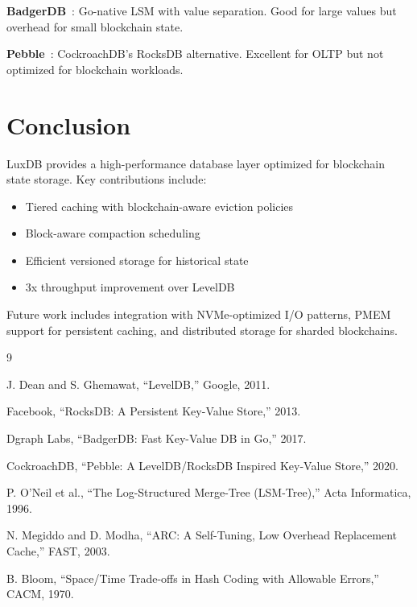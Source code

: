 \documentclass[11pt,a4paper]{article}
\begin{document}
\textbf{BadgerDB}~\cite{badger}: Go-native LSM with value separation. Good for large values but overhead for small blockchain state.

\textbf{Pebble}~\cite{pebble}: CockroachDB's RocksDB alternative. Excellent for OLTP but not optimized for blockchain workloads.

\section{Conclusion}

LuxDB provides a high-performance database layer optimized for blockchain state storage. Key contributions include:

\begin{itemize}
    \item Tiered caching with blockchain-aware eviction policies
    \item Block-aware compaction scheduling
    \item Efficient versioned storage for historical state
    \item 3x throughput improvement over LevelDB
\end{itemize}

Future work includes integration with NVMe-optimized I/O patterns, PMEM support for persistent caching, and distributed storage for sharded blockchains.

\begin{thebibliography}{9}

J. Dean and S. Ghemawat, ``LevelDB,'' Google, 2011.

Facebook, ``RocksDB: A Persistent Key-Value Store,'' 2013.

Dgraph Labs, ``BadgerDB: Fast Key-Value DB in Go,'' 2017.

CockroachDB, ``Pebble: A LevelDB/RocksDB Inspired Key-Value Store,'' 2020.

P. O'Neil et al., ``The Log-Structured Merge-Tree (LSM-Tree),'' Acta Informatica, 1996.

N. Megiddo and D. Modha, ``ARC: A Self-Tuning, Low Overhead Replacement Cache,'' FAST, 2003.

B. Bloom, ``Space/Time Trade-offs in Hash Coding with Allowable Errors,'' CACM, 1970.

\end{thebibliography}
\end{document}
